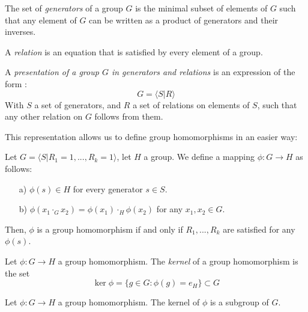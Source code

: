 \begin{definition}
  The set of \emph{generators} of a group $G$ is the minimal subset of elements of $G$ such that any element of $G$ can be written as a product of generators and their inverses.
\end{definition}


\begin{definition}
  A \emph{relation} is an equation that is satisfied by every element of a group. 
\end{definition}
  
\begin{definition}
  A \emph{presentation of a group $G$ in generators and relations} is an expression of the form : 
  \[
    G = \langle S | R\rangle
  \]
  With $S$ a set of generators, and $R$ a set of relations on elements of $S$, such that any other relation on $G$ follows from them. 
\end{definition}


This representation allows us to define group homomorphisms in an easier way:

\begin{theorem*}
  Let $G = \langle S | R_1 = 1, ..., R_k = 1 \rangle$, let $H$ a group. We define a mapping $\phi: G \to H$ as follows: 
  \begin{enumerate}
    \item[a)] $\phi(s) \in H$ for every generator $s \in S$. 
    \item[b)] $\phi(x_1 \cdot_G x_2) = \phi(x_1) \cdot_H \phi(x_2)$ for any $x_1, x_2 \in G$.
  \end{enumerate}
  Then, $\phi$ is a group homomorphism if and only if $R_1, ..., R_k$ are satisfied for any $\phi(s)$.
\end{theorem*}
\begin{definition}
  Let $\phi: G \to H$ a group homomorphism. The \emph{kernel} of a group homomorphism is the set 
  \[
    \ker \phi = \{g \in G: \phi(g) = e_H\} \subset G
  \]
\end{definition}

\begin{theorem*}
  Let $\phi: G \to H$ a group homomorphism. The kernel of $\phi$ is a subgroup of $G$. 
\end{theorem*}

